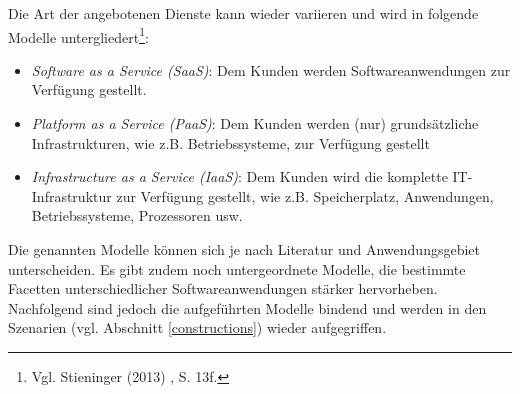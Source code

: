 Die Art der angebotenen Dienste kann wieder variieren und wird in folgende Modelle untergliedert\footnote{Vgl. Stieninger (2013) \cite{stieninger}, S. 13f.}:
\begin{itemize}
	\item \textit{Software as a Service (SaaS)}: Dem Kunden werden Softwareanwendungen zur Verfügung gestellt.
	\item \textit{Platform as a Service (PaaS)}: Dem Kunden werden (nur) grundsätzliche Infrastrukturen, wie z.B. Betriebssysteme, zur Verfügung gestellt
	\item \textit{Infrastructure as a Service (IaaS)}: Dem Kunden wird die komplette IT-Infrastruktur zur Verfügung gestellt, wie z.B. Speicherplatz, Anwendungen, Betriebssysteme, Prozessoren usw.
\end{itemize}

Die genannten Modelle können sich je nach Literatur und Anwendungsgebiet unterscheiden. Es gibt zudem noch untergeordnete Modelle, die bestimmte Facetten unterschiedlicher Softwareanwendungen stärker hervorheben. Nachfolgend sind jedoch die aufgeführten Modelle bindend und werden in den Szenarien (vgl. Abschnitt \ref{constructions}) wieder aufgegriffen.